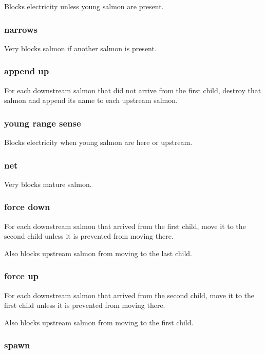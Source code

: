\documentclass[10pt]{article}
\begin{document}
Blocks electricity unless young salmon are present.

\subsubsection{narrows}

Very blocks salmon if another salmon is present.

\subsubsection{append up}

For each downstream salmon that did not arrive from the first child, destroy that salmon and append its name
to each upstream salmon.

\subsubsection{young range sense}

Blocks electricity when young salmon are here or upstream.

\subsubsection{net}

Very blocks mature salmon.

\subsubsection{force down}

For each downstream salmon that arrived from the first child, move it to the second child unless it is prevented from moving
there.

Also blocks upstream salmon from moving to the last child.

\subsubsection{force up}

For each downstream salmon that arrived from the second child, move it to the first child unless it is prevented from moving
there.

Also blocks upstream salmon from moving to the first child.

\subsubsection{spawn}
\end{document}
